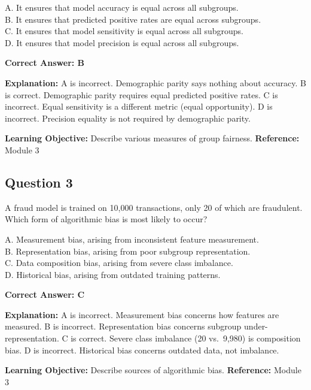 \documentclass[11pt]{article}
\begin{document}
	A. It ensures that model accuracy is equal across all subgroups.\\
	B. It ensures that predicted positive rates are equal across subgroups.\\
	C. It ensures that model sensitivity is equal across all subgroups.\\
	D. It ensures that model precision is equal across all subgroups.
	
	\vspace{0.4em}
	\textbf{Correct Answer: B}
	
	\textbf{Explanation:}
	A is incorrect. Demographic parity says nothing about accuracy.
	B is correct. Demographic parity requires equal predicted positive rates.
	C is incorrect. Equal sensitivity is a different metric (equal opportunity).
	D is incorrect. Precision equality is not required by demographic parity.
	
	\textbf{Learning Objective:} Describe various measures of group fairness.
	\textbf{Reference:} Module 3
	
	\subsection*{Question 3}
	A fraud model is trained on 10{,}000 transactions, only 20 of which are
	fraudulent. Which form of algorithmic bias is most likely to occur?
	
	A. Measurement bias, arising from inconsistent feature measurement.\\
	B. Representation bias, arising from poor subgroup representation.\\
	C. Data composition bias, arising from severe class imbalance.\\
	D. Historical bias, arising from outdated training patterns.
	
	\vspace{0.4em}
	\textbf{Correct Answer: C}
	
	\textbf{Explanation:}
	A is incorrect. Measurement bias concerns how features are measured.
	B is incorrect. Representation bias concerns subgroup under-representation.
	C is correct. Severe class imbalance (20 vs.\ 9{,}980) is composition bias.
	D is incorrect. Historical bias concerns outdated data, not imbalance.
	
	\textbf{Learning Objective:} Describe sources of algorithmic bias.
	\textbf{Reference:} Module 3
	
\end{document}
